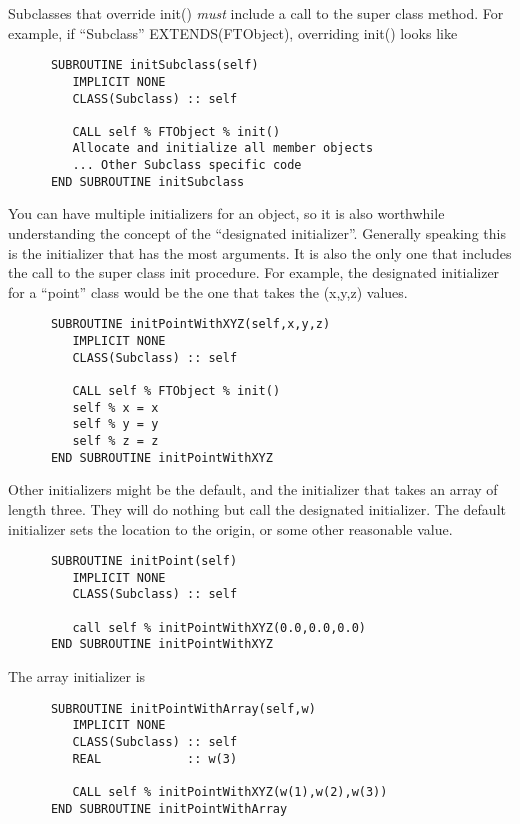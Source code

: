 \documentclass[9pt]{article}
\begin{document}
 Subclasses that override init() \emph{must} include 
 a call to the super class method. For example, if ``Subclass'' EXTENDS(FTObject), overriding init() looks like

{\color{blue}\begin{verbatim}
      SUBROUTINE initSubclass(self) 
         IMPLICIT NONE
         CLASS(Subclass) :: self
         
         CALL self % FTObject % init()
         Allocate and initialize all member objects
         ... Other Subclass specific code
      END SUBROUTINE initSubclass
\end{verbatim}}

You can have multiple initializers for an object, so it is also worthwhile understanding the concept of the ``designated initializer''. Generally speaking this is the
initializer that has the most arguments. It is also the only one that includes the call to the super class init procedure. For example, the designated initializer for a ``point'' class would be the one that takes the (x,y,z) values.

{\color{blue}\begin{verbatim}
      SUBROUTINE initPointWithXYZ(self,x,y,z) 
         IMPLICIT NONE
         CLASS(Subclass) :: self
         
         CALL self % FTObject % init()
         self % x = x
         self % y = y
         self % z = z
      END SUBROUTINE initPointWithXYZ
\end{verbatim}}

Other initializers might be the default, and the initializer that takes an array of length three. They will
do nothing but call the designated initializer. The default initializer sets the location to the origin, or some other
reasonable value.

{\color{blue}\begin{verbatim}
      SUBROUTINE initPoint(self) 
         IMPLICIT NONE
         CLASS(Subclass) :: self
         
         call self % initPointWithXYZ(0.0,0.0,0.0)
      END SUBROUTINE initPointWithXYZ
\end{verbatim}}

The array initializer is
{\color{blue}\begin{verbatim}
      SUBROUTINE initPointWithArray(self,w) 
         IMPLICIT NONE
         CLASS(Subclass) :: self
         REAL            :: w(3)
         
         CALL self % initPointWithXYZ(w(1),w(2),w(3))
      END SUBROUTINE initPointWithArray
\end{verbatim}}
\end{document}
